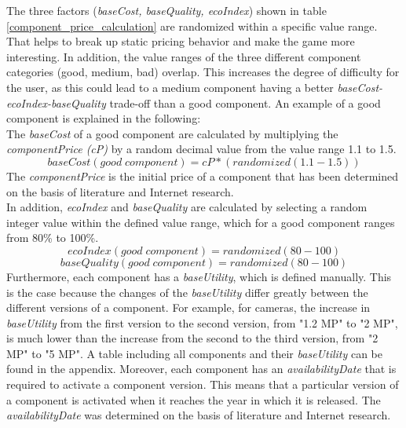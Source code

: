 \newline
The three factors (\textit{baseCost, baseQuality, ecoIndex}) shown in table \ref{component_price_calculation} are randomized within a specific value range. That helps to break up static pricing behavior and make the game more interesting. In addition, the value ranges of the three different component categories (good, medium, bad) overlap. This increases the degree of difficulty for the user, as this could lead to a medium component having a better \textit{baseCost-ecoIndex-baseQuality} trade-off than a good component. An example of a good component is explained in the following:\\
The \textit{baseCost} of a good component are calculated by multiplying the \textit{componentPrice (cP)} by a random decimal value from the value range 1.1 to 1.5.
\begin{equation}
    baseCost(good \; component) = cP * (randomized(1.1-1.5))
\end{equation}
The \textit{componentPrice} is the initial price of a component that has been determined on the basis of literature and Internet research.\\ %
In addition, \textit{ecoIndex} and \textit{baseQuality} are calculated by selecting a random integer value within the defined value range, which for a good component ranges from 80\% to 100\%.
\begin{equation}
    ecoIndex(good \; component) = randomized(80-100)
\end{equation}
\begin{equation}
    baseQuality(good \; component) = randomized(80-100)
\end{equation}
Furthermore, each component has a \textit{baseUtility}, which is defined manually. This is the case because the changes of the \textit{baseUtility} differ greatly between the different versions of a component. For example, for cameras, the increase in \textit{baseUtility} from the first version to the second version, from "1.2 MP" to "2 MP", is much lower than the increase from the second to the third version, from "2 MP" to "5 MP". A table including all components and their \textit{baseUtility} can be found in the appendix. %
\newline
Moreover, each component has an \textit{availabilityDate} that is required to activate a component version. This means that a particular version of a component is activated when it reaches the year in which it is released. The \textit{availabilityDate} was determined on the basis of literature and Internet research. %
